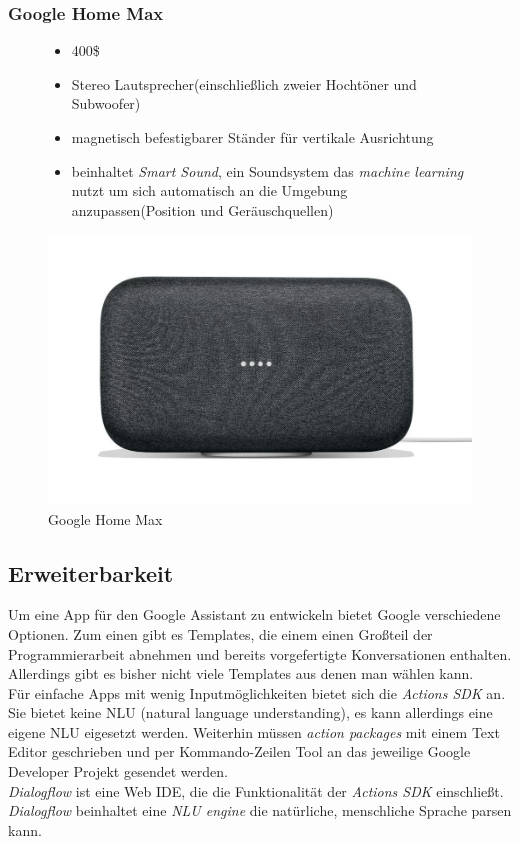 \subsubsection{Google Home Max}
\begin{figure}[H]
	\begin{minipage}{0.45\textwidth}
	  \begin{itemize}
	  \item 400\$
	  \item Stereo Lautsprecher(einschließlich zweier Hochtöner und Subwoofer)
	  \item magnetisch befestigbarer Ständer für vertikale Ausrichtung
	  \item beinhaltet \textit{Smart Sound}, ein Soundsystem das \textit{machine learning} nutzt um sich automatisch an die Umgebung anzupassen(Position und Geräuschquellen)
	  \end{itemize}
	\end{minipage}
	\hfill
	\begin{minipage}{0.45\textwidth}
	  \centering
      \includegraphics[width=\textwidth]{content/img/GoogleHomeMax}
      \caption[Google Home Max]{Google Home Max}
	\end{minipage}
\end{figure}

\subsection{Erweiterbarkeit}

Um eine App für den Google Assistant zu entwickeln bietet Google verschiedene Optionen.
Zum einen gibt es Templates, die einem einen Großteil der Programmierarbeit abnehmen und bereits vorgefertigte Konversationen enthalten. Allerdings gibt es bisher nicht viele Templates aus denen man wählen kann.\\
Für einfache Apps mit wenig Inputmöglichkeiten bietet sich die \textit{Actions SDK} an. Sie bietet keine NLU (natural language understanding), es kann allerdings eine eigene NLU eigesetzt werden.
Weiterhin müssen \textit{action packages} mit einem Text Editor geschrieben und per Kommando-Zeilen Tool an das jeweilige Google Developer Projekt gesendet werden.\\
\textit{Dialogflow} ist eine Web IDE, die die Funktionalität der \textit{Actions SDK} einschließt.
\textit{Dialogflow} beinhaltet eine \textit{NLU engine} die natürliche, menschliche Sprache parsen kann.

